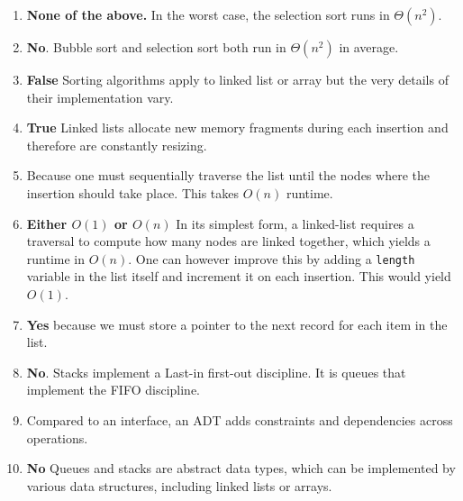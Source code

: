 \documentclass[11pt]{article}
\begin{document}
\begin{enumerate}
\item \textbf{None of the above.} In the worst case, the selection
sort runs in \(\Theta(n^2)\).

\item \textbf{No}. Bubble sort and selection sort both run in \(\Theta(n^2)\) in
average.

\item \textbf{False} Sorting algorithms apply to linked list or array
but the very details of their implementation vary.

\item \textbf{True} Linked lists allocate new memory fragments during each
insertion and therefore are constantly resizing.

\item Because one must sequentially traverse the list until the nodes
where the insertion should take place. This takes \(O(n)\) runtime.

\item \textbf{Either \(O(1)\) or \(O(n)\)} In its simplest form, a linked-list
requires a traversal to compute how many nodes are linked together,
which yields a runtime in \(O(n)\). One can however improve this by
adding a \texttt{length} variable in the list itself and increment it on
each insertion. This would yield \(O(1)\).

\item \textbf{Yes} because we must store a pointer to the next record for each
item in the list.

\item \textbf{No}. Stacks implement a Last-in first-out discipline. It is queues
that implement the FIFO discipline.

\item Compared to an interface, an ADT adds constraints and dependencies
across operations.

\item \textbf{No} Queues and stacks are abstract data types, which can be
implemented by various data structures, including linked lists or
arrays.
\end{enumerate}
\end{document}
